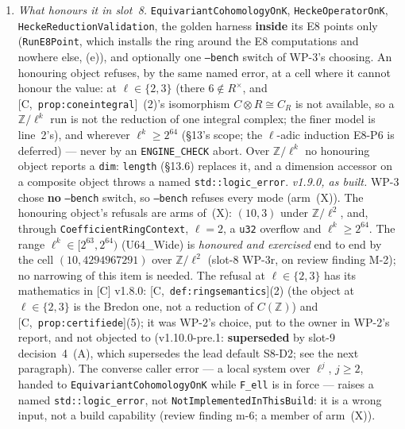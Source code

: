 \documentclass[11pt]{article}
\theoremstyle{remark}
\newcommand{\Z}{\mathbb{Z}}
\newcommand{\HA}[1]{[C,~\texttt{#1}]}      %
\begin{document}
\begin{enumerate}[label=(b\arabic*)]
  \texttt{hecke::NotImplementedInThisBuild} whose text names the class and the canonical value
  (for example \texttt{"<Class>: coefficient\_ring=Z/ell\textasciicircum<k> is not honoured in this
  build"}), with a test arm; or it is \textbf{unreachable} under a non-default ring, with the
  reason. None is silent. A refusing member refuses when the setting in force is non-default
  \emph{or} when an input object it is handed was constructed over a composite ring: by~(a), an
  object's ring is its own, whatever is in force when it is consumed.
\item \emph{What honours it in slot~8.} \texttt{EquivariantCohomologyOnK},
  \texttt{HeckeOperatorOnK}, \texttt{HeckeReductionValidation}, the golden harness \textbf{inside}
  its E8 points only (\texttt{RunE8Point}, which installs the ring around the E8 computations and
  nowhere else, (e)), and optionally one \texttt{--bench} switch of WP-3's choosing. An honouring
  object refuses, by the same named error, at a cell where it cannot honour the value: at
  $\ell\in\{2,3\}$ (there $6\notin R^\times$, and \HA{prop:coneintegral}~(2)'s isomorphism $C\otimes R\cong C_R$ is not available,
  so a $\Z/\ell^k$ run is not the reduction of one integral complex; the finer model is line~2's), and wherever $\ell^k\ge2^{64}$ (\S13's
  scope; the $\ell$-adic induction E8-P6 is deferred) --- never by an \texttt{ENGINE\_CHECK} abort.
  Over $\Z/\ell^k$ no honouring object reports a \texttt{dim}: \texttt{length} (\S13.6) replaces
  it, and a dimension accessor on a composite object throws a named \texttt{std::logic\_error}.
  \emph{v1.9.0, as built.} WP-3 chose \textbf{no} \texttt{--bench} switch, so \texttt{--bench}
  refuses every mode (arm~(X)). The honouring object's refusals are arms of~(X): $(10,3)$ under
  $\Z/\ell^2$, and, through \texttt{CoefficientRingContext}, $\ell=2$, a \texttt{u32} overflow
  and $\ell^k\ge2^{64}$. The range $\ell^k\in[2^{63},2^{64})$ (U64\_Wide) is
  \emph{honoured and exercised} end to end by the cell $(10,4294967291)$ over $\Z/\ell^2$ (slot-8
  WP-3r, on review finding M-2); no narrowing of this item is needed. The refusal at
  $\ell\in\{2,3\}$ has its mathematics in [C] v1.8.0: \HA{def:ringsemantics}(2) (the object at
  $\ell\in\{2,3\}$ is the Bredon one, not a reduction of $C(\Z)$) and \HA{prop:certifiede}(5); it
  was WP-2's choice, put to the owner in WP-2's report, and not objected to (v1.10.0-pre.1:
  \textbf{superseded} by slot-9 decision~4~(A), which supersedes the lead default S8-D2; see the
  next paragraph). The converse caller
  error --- a local system over $\ell^j$, $j\ge2$, handed to \texttt{EquivariantCohomologyOnK}
  while \texttt{F\_ell} is in force --- raises a named \texttt{std::logic\_error}, not
  \texttt{NotImplementedInThisBuild}: it is a wrong input, not a build capability (review finding
  m-6; a member of arm~(X)).


\end{enumerate}
\end{document}
